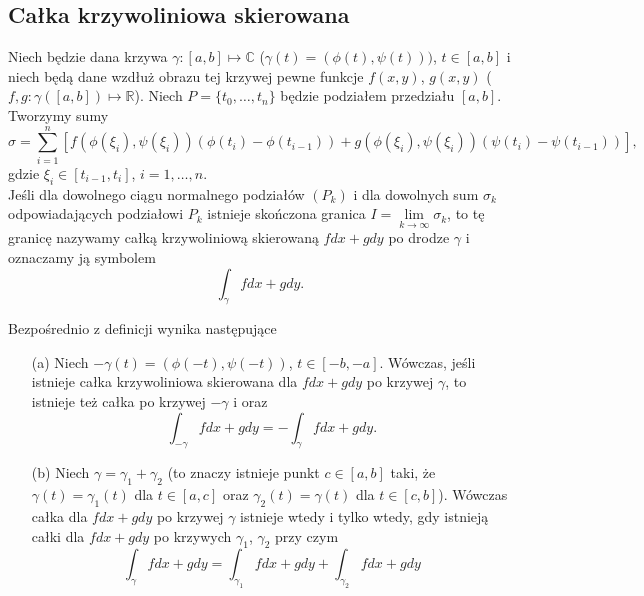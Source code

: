 \documentclass[leqno]{article}
\begin{document}
\begin{justify}
\subsection{Całka krzywoliniowa skierowana}

\begin{defn}
    Niech będzie dana krzywa $\gamma : [a,b] \mapsto \mathbb{C}$ ($\gamma(t) = (\phi(t), \psi(t)))$, $t \in [a,b]$ i niech
    będą dane wzdłuż obrazu tej krzywej pewne funkcje $f(x,y)$, $g(x,y)$ ($f, g : \gamma([a,b]) \mapsto \mathbb{R}$). Niech
    $P = \{t_0, \ldots, t_n\}$ będzie podziałem przedziału $[a,b]$. Tworzymy sumy
    \[
        \sigma = \sum_{i=1}^{n}[f(\phi(\xi_i),\psi(\xi_i))(\phi(t_i) - \phi(t_{i-1})) + g(\phi(\xi_i), \psi(\xi_i))(\psi(t_i) - \psi(t_{i-1}))],
    \]
    gdzie $\xi_i \in [t_{i-1}, t_i]$, $i = 1, \ldots, n$. \\
    Jeśli dla dowolnego ciągu normalnego podziałów $(P_k)$ i dla dowolnych sum $\sigma_k$ odpowiadających podziałowi $P_k$ istnieje 
    skończona granica $I = \lim\limits_{k \to \infty}\sigma_k$, to tę granicę nazywamy całką krzywoliniową skierowaną $fdx + gdy$ po drodze 
    $\gamma$ i oznaczamy ją symbolem
    \[
        \int_{\gamma}fdx + gdy.
    \]
\end{defn}

Bezpośrednio z definicji wynika następujące

\begin{theorem}
{
    \begin{itemize}
        \item [(a)]
            Niech $-\gamma(t) = (\phi(-t), \psi(-t))$, $t \in [-b,-a]$. Wówczas, jeśli istnieje całka krzywoliniowa skierowana dla 
            $fdx + gdy$ po krzywej $\gamma$, to istnieje też całka po krzywej $-\gamma$ i oraz
            \[
                \int_{-\gamma}fdx + gdy = -\int_{\gamma}fdx + gdy.
            \]
        \item [(b)]
            Niech $\gamma = \gamma_1 + \gamma_2$ (to znaczy istnieje punkt $c \in [a,b]$ taki, że $\gamma(t)=\gamma_1(t)$ dla $t \in [a,c]$ oraz $\gamma_2(t)=\gamma(t)$ dla $t \in [c,b]$). Wówczas całka dla $fdx + gdy$ po krzywej $\gamma$ istnieje wtedy i tylko wtedy, gdy istnieją całki dla $fdx + gdy$ po krzywych $\gamma_1$, $\gamma_2$ przy czym
            \[
                \int_{\gamma}fdx + gdy = \int_{\gamma_1}fdx+gdy + \int_{\gamma_2}fdx+gdy
            \]
    \end{itemize}
}
\end{theorem}


\end{justify}
\end{document}
